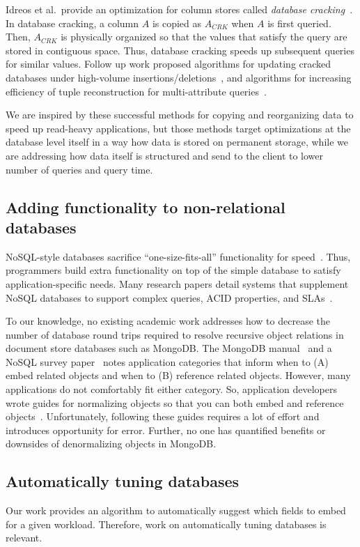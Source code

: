 Idreos et al.~provide an optimization for column stores called {\em database cracking}~\cite{Pirk2007}.
In database cracking, a column $A$ is copied as $A_{CRK}$ when $A$ is first queried.
Then, $A_{CRK}$ is physically organized so that the values that satisfy the query are stored in contiguous space.
Thus, database cracking speeds up subsequent queries for similar values.
Follow up work proposed algorithms for updating cracked databases under high-volume insertions/deletions~\cite{Idreos2007}, and algorithms for increasing efficiency of tuple reconstruction for multi-attribute queries~\cite{Idreos2009}.

We are inspired by these successful methods for copying and reorganizing data to speed up read-heavy applications, but those methods target optimizations at the database level itself in a way how data is stored on permanent storage, while we are addressing how data itself is structured and send to the client to lower number of queries and query time.

\subsection{Adding functionality to non-relational databases} 

NoSQL-style databases sacrifice ``one-size-fits-all'' functionality for speed~\cite{Strauch}.
Thus, programmers build extra functionality on top of the simple database to satisfy application-specific needs.
Many research papers detail systems that supplement NoSQL databases to support complex queries, ACID properties, and SLAs~\cite{Decandia2007,Chang,Beaver2010,Baker}. 

To our knowledge, no existing academic work addresses how to decrease the number of database round trips required to resolve recursive object relations in document store databases such as MongoDB.
The MongoDB manual~\cite{MongoDB2014} and a NoSQL survey paper~\cite{Strauch} notes application categories that inform when to (A) embed related objects and when to (B) reference related objects.
However, many applications do not comfortably fit either category.
So, application developers wrote guides for normalizing objects so that you can both embed and reference objects~\cite{Wanschik2010}.
Unfortunately, following these guides requires a lot of effort and introduces opportunity for error.
Further, no one has quantified benefits or downsides of denormalizing objects in MongoDB.

\subsection{Automatically tuning databases}
Our work provides an algorithm to automatically suggest which fields to embed for a given workload. 
Therefore, work on automatically tuning databases is relevant. 

